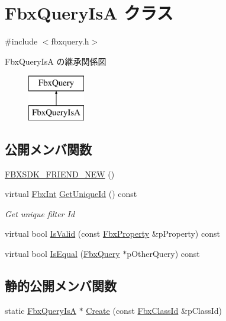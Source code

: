\hypertarget{class_fbx_query_is_a}{}\section{Fbx\+Query\+IsA クラス}
\label{class_fbx_query_is_a}


{\ttfamily \#include $<$fbxquery.\+h$>$}

Fbx\+Query\+IsA の継承関係図\begin{figure}[H]
\begin{center}
\leavevmode
\includegraphics[height=2.000000cm]{class_fbx_query_is_a}
\end{center}
\end{figure}
\subsection*{公開メンバ関数}
\begin{DoxyCompactItemize}
\item 
\hyperlink{class_fbx_query_is_a_a07dda20fad6d4ede4d322dd71e54a67a}{F\+B\+X\+S\+D\+K\+\_\+\+F\+R\+I\+E\+N\+D\+\_\+\+N\+EW} ()
\item 
virtual \hyperlink{fbxtypes_8h_a088fa96de3b0b3ea69f0f6afef525dfb}{Fbx\+Int} \hyperlink{class_fbx_query_is_a_acf42ad6bd28bf6543ab09642561ee73b}{Get\+Unique\+Id} () const
\begin{DoxyCompactList}\small\item\em Get unique filter Id \end{DoxyCompactList}\item 
virtual bool \hyperlink{class_fbx_query_is_a_a6d3da2f05ab6e50346af8e9713168772}{Is\+Valid} (const \hyperlink{class_fbx_property}{Fbx\+Property} \&p\+Property) const
\item 
virtual bool \hyperlink{class_fbx_query_is_a_a49b41a34152be44240671b8ae59a4d19}{Is\+Equal} (\hyperlink{class_fbx_query}{Fbx\+Query} $\ast$p\+Other\+Query) const
\end{DoxyCompactItemize}
\subsection*{静的公開メンバ関数}
\begin{DoxyCompactItemize}
\item 
static \hyperlink{class_fbx_query_is_a}{Fbx\+Query\+IsA} $\ast$ \hyperlink{class_fbx_query_is_a_a2f148f1f0d2ef5eb863d091d65a25de8}{Create} (const \hyperlink{class_fbx_class_id}{Fbx\+Class\+Id} \&p\+Class\+Id)
\end{DoxyCompactItemize}
